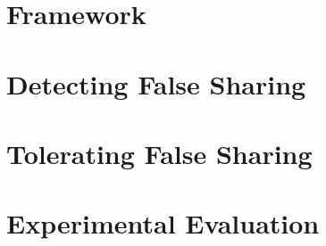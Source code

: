 \section{Framework}


\section{Detecting False Sharing}


\section{Tolerating False Sharing}


\section{Experimental Evaluation}

